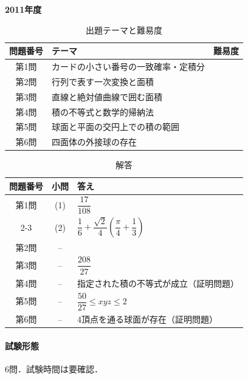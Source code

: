 \documentclass[../../main.tex]{subfiles}
\begin{document}
\begin{center}
  {\fontsize{48pt}{58pt}\selectfont \textbf{2011}\normalsize\textbf{年度}}
\end{center}

\begin{table}[htb]
  \centering
  \caption{出題テーマと難易度}
  \begin{tabular}{|c|p{9cm}|c|}
    \hline
    \textbf{問題番号} & \textbf{テーマ} & \textbf{難易度} \\
    \hline
    第1問 & カードの小さい番号の一致確率・定積分 & \\
    \hline
    第2問 & 行列で表す一次変換と面積 & \\
    \hline
    第3問 & 直線と絶対値曲線で囲む面積 & \\
    \hline
    第4問 & 積の不等式と数学的帰納法 & \\
    \hline
    第5問 & 球面と平面の交円上での積の範囲 & \\
    \hline
    第6問 & 四面体の外接球の存在 & \\
    \hline
  \end{tabular}
\end{table}

\begin{table}[htb]
  \centering
  \caption{解答}
  \renewcommand{\arraystretch}{1.4}
  \begin{tabular}{|c|c|p{9cm}|}
    \hline
    \textbf{問題番号} & \textbf{小問} & \textbf{答え} \\
    \hline
    第1問 & (1) & $\dfrac{17}{108}$ \\
    \cline{2-3}
    & (2) & $\dfrac{1}{6}+\dfrac{\sqrt{2}}{4}\left(\dfrac{\pi}{4}+\dfrac{1}{3}\right)$ \\
    \hline
    第2問 & -- &  \\
    \hline
    第3問 & -- & $\dfrac{208}{27}$ \\
    \hline
    第4問 & -- & 指定された積の不等式が成立（証明問題） \\
    \hline
    第5問 & -- & $\dfrac{50}{27}\le xyz\le2$ \\
    \hline
    第6問 & -- & 4頂点を通る球面が存在（証明問題） \\
    \hline
  \end{tabular}
\end{table}

\paragraph{試験形態}
6問．試験時間は要確認．
\end{document}
